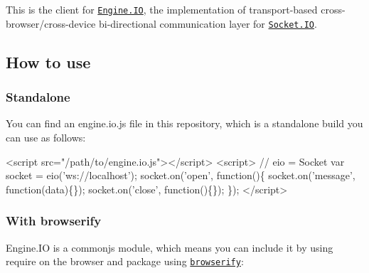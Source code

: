 \href{http://travis-ci.org/socketio/engine.io-client}{\tt } \href{http://badge.fury.io/js/engine.io-client}{\tt }

This is the client for \href{http://github.com/socketio/engine.io}{\tt Engine.\+IO}, the implementation of transport-\/based cross-\/browser/cross-\/device bi-\/directional communication layer for \href{http://github.com/socketio/socket.io}{\tt Socket.\+IO}.

\subsection*{How to use}

\subsubsection*{Standalone}

You can find an {\ttfamily engine.\+io.\+js} file in this repository, which is a standalone build you can use as follows\+:


\begin{DoxyCode}
<script src="/path/to/engine.io.js"></script>
<script>
  // eio = Socket
  var socket = eio('ws://localhost');
  socket.on('open', function()\{
    socket.on('message', function(data)\{\});
    socket.on('close', function()\{\});
  \});
</script>
\end{DoxyCode}


\subsubsection*{With browserify}

Engine.\+IO is a commonjs module, which means you can include it by using {\ttfamily require} on the browser and package using \href{http://browserify.org/}{\tt browserify}\+:


